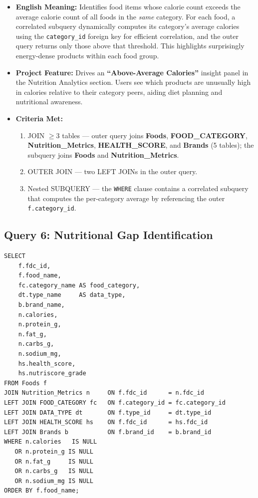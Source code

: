 \documentclass[12pt,a4paper]{article}
\begin{document}
\begin{metabox}
\begin{itemize}
  \item \textbf{English Meaning:} Identifies food items whose calorie count exceeds the
    average calorie count of all foods in the \emph{same} category. For each food, a
    correlated subquery dynamically computes its category's average calories using
    the \texttt{category\_id} foreign key for efficient correlation, and the outer
    query returns only those above that threshold. This highlights surprisingly energy-dense
    products within each food group.
  \item \textbf{Project Feature:} Drives an \textbf{``Above-Average Calories''} insight
    panel in the Nutrition Analytics section. Users see which products are unusually high
    in calories relative to their category peers, aiding diet planning and nutritional
    awareness.
  \item \textbf{Criteria Met:}
    \begin{enumerate}[label=\textbf{\arabic*}]
      \item JOIN $\geq$3 tables --- outer query joins \textbf{Foods}, \textbf{FOOD\_CATEGORY},
        \textbf{Nutrition\_Metrics}, \textbf{HEALTH\_SCORE}, and \textbf{Brands} (5 tables);
        the subquery joins \textbf{Foods} and \textbf{Nutrition\_Metrics}.
      \item OUTER JOIN --- two LEFT JOINs in the outer query.
      \item Nested SUBQUERY --- the \texttt{WHERE} clause contains a correlated subquery
        that computes the per-category average by referencing the outer \texttt{f.category\_id}.
    \end{enumerate}
\end{itemize}
\end{metabox}

\subsection{Query 6: Nutritional Gap Identification}

\begin{sqlbox}
\small
\begin{verbatim}
SELECT
    f.fdc_id,
    f.food_name,
    fc.category_name AS food_category,
    dt.type_name     AS data_type,
    b.brand_name,
    n.calories,
    n.protein_g,
    n.fat_g,
    n.carbs_g,
    n.sodium_mg,
    hs.health_score,
    hs.nutriscore_grade
FROM Foods f
JOIN Nutrition_Metrics n     ON f.fdc_id      = n.fdc_id
LEFT JOIN FOOD_CATEGORY fc   ON f.category_id = fc.category_id
LEFT JOIN DATA_TYPE dt       ON f.type_id     = dt.type_id
LEFT JOIN HEALTH_SCORE hs    ON f.fdc_id      = hs.fdc_id
LEFT JOIN Brands b           ON f.brand_id    = b.brand_id
WHERE n.calories   IS NULL
   OR n.protein_g IS NULL
   OR n.fat_g     IS NULL
   OR n.carbs_g   IS NULL
   OR n.sodium_mg IS NULL
ORDER BY f.food_name;
\end{verbatim}
\end{sqlbox}
\end{document}
